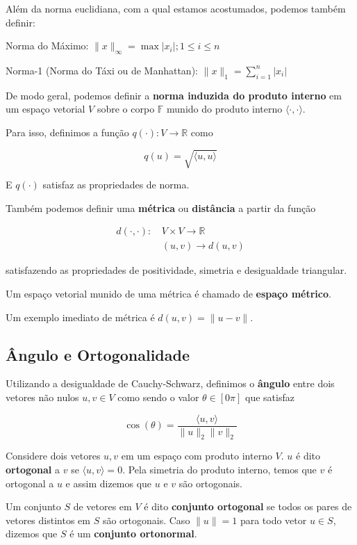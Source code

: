 \documentclass[12pt,a4paper]{article}
\begin{document}
Além da norma euclidiana, com a qual estamos acostumados, podemos também definir:

Norma do Máximo: $\| x \|_{\infty} = \max{|x_i|; 1 \leq i \leq n}$

Norma-1 (Norma do Táxi ou de Manhattan): $\| x \|_1 = \sum_{i=1}^n | x_i |$

De modo geral, podemos definir a \textbf{norma induzida do produto interno} em um espaço vetorial $V$ sobre o corpo $\mathbb{F}$ munido do produto interno $\langle \cdot, \cdot \rangle$.

Para isso, definimos a função $q(\cdot): V \to \mathbb{R}$ como

\[
q(u) = \sqrt{\langle u, u \rangle}
\]

E $q(\cdot)$ satisfaz as propriedades de norma.

Também podemos definir uma \textbf{métrica} ou \textbf{distância} a partir da função

\begin{equation*}
\begin{split}
d(\cdot, \cdot) : \, &V \times V \to \mathbb{R} \\
 & (u,v) \to d(u,v)
\end{split}
\end{equation*}

satisfazendo as propriedades de positividade, simetria e desigualdade triangular.

Um espaço vetorial munido de uma métrica é chamado de \textbf{espaço métrico}.

Um exemplo imediato de métrica é $d(u,v) = \| u - v \|$.

\subsection{Ângulo e Ortogonalidade}

Utilizando a desigualdade de Cauchy-Schwarz, definimos o \textbf{ângulo} entre dois vetores não nulos $u, v \in V$ como sendo o valor $\theta \in [0 \pi ]$ que satisfaz

\[
\cos(\theta) = \frac{\langle u, v \rangle}{\| u \|_2 \|v\|_2}
\]

Considere dois vetores $u, v$ em um espaço com produto interno $V$. $u$ é dito \textbf{ortogonal} a $v$ se $\langle u, v \rangle = 0$. Pela simetria do produto interno, temos que $v$ é ortogonal a $u$ e assim dizemos que $u$ e $v$ são ortogonais.

Um conjunto $S$ de vetores em $V$ é dito \textbf{conjunto ortogonal} se todos os pares de vetores distintos em $S$ são ortogonais. Caso $\| u \| = 1$ para todo vetor $u \in S$, dizemos que $S$ é um \textbf{conjunto ortonormal}.
\end{document}
